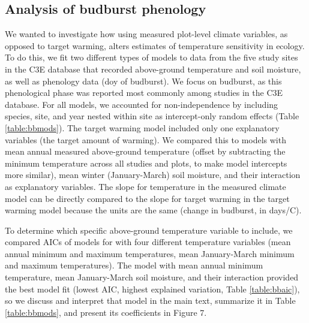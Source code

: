 \documentclass{article}
\begin{document}
\subsection* {Analysis of budburst phenology}
We wanted to investigate how using measured plot-level climate variables, as opposed to target warming, alters estimates of temperature sensitivity in ecology. To do this, we fit two different types of models to data from the five study sites in the C3E database that recorded above-ground temperature and soil moisture, as well as phenology data (doy of budburst). We focus on budburst, as this phenological phase was reported most commonly among studies in the C3E database. For all models, we accounted for non-independence by including species, site, and year nested within site as intercept-only random effects (Table \ref{table:bbmods}). The target warming model included only one explanatory variables (the target amount of warming).  We compared this to models with mean annual measured above-ground temperature (offset by subtracting the minimum temperature across all studies and plots, to make model intercepts more similar), mean winter (January-March) soil moisture, and their interaction as explanatory variables. The slope for temperature in the measured climate model can be directly compared to the slope for target warming in the target warming model because the units are the same (change in budburst, in days/\degree C).
\par To determine which specific above-ground temperature variable to include, we compared AICs of models for with four different temperature variables (mean annual minimum and maximum temperatures, mean January-March minimum and maximum temperatures). The model with mean annual minimum temperature, mean January-March soil moisture, and their interaction provided the best model fit (lowest AIC, highest explained variation, Table \ref{table:bbaic}), so we discuss and interpret that model in the main text, summarize it in Table \ref{table:bbmods}, and present its coefficients in Figure 7. 


\clearpage
\end{document}
